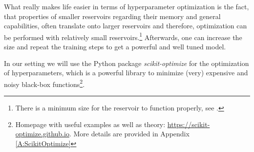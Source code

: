What really makes life easier in terms of hyperparameter optimization is the fact, that properties of smaller reservoirs regarding their memory and general capabilities, often translate onto larger reservoirs and therefore, optimization can be performed with relatively small reservoirs.\footnote{There is a minimum size for the reservoir to function properly, see \citep{Lukosecicius2012}.} Afterwards, one can increase the size and repeat the training steps to get a powerful and well tuned model.

In our setting we will use the Python package {\it scikit-optimize} for the optimization of hyperparameters, which is a powerful library to minimize (very) expensive and noisy black-box functions\footnote{Homepage with useful examples as well as theory: \url{https://scikit-optimize.github.io}. More details are provided in Appendix \ref{A:ScikitOptimize}}.




